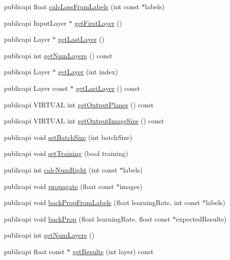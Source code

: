 \begin{DoxyCompactItemize}
publicapi float \hyperlink{classNeuralNet_abd31a3135dcdeaf91eb6ee7be58a676c}{calc\-Loss\-From\-Labels} (int const $\ast$labels)
\item 
publicapi Input\-Layer $\ast$ \hyperlink{classNeuralNet_a2b2ea77732a5969b70453a110c4a10e8}{get\-First\-Layer} ()
\item 
publicapi Layer $\ast$ \hyperlink{classNeuralNet_a21256dd9a2c7834be50f4d84e2c9e947}{get\-Last\-Layer} ()
\item 
publicapi int \hyperlink{classNeuralNet_ab0914b73f5ecd0291f2ce2070d824757}{get\-Num\-Layers} () const 
\item 
publicapi Layer $\ast$ \hyperlink{classNeuralNet_ac1909a900477ba46c7284cfbfa262ead}{get\-Layer} (int index)
\item 
publicapi Layer const $\ast$ \hyperlink{classNeuralNet_a92eb5fa55ec81929637d9c5884de432a}{get\-Last\-Layer} () const 
\item 
publicapi V\-I\-R\-T\-U\-A\-L int \hyperlink{classNeuralNet_ab32d1d2225a84dfeaee28fdf57d7eed6}{get\-Output\-Planes} () const 
\item 
publicapi V\-I\-R\-T\-U\-A\-L int \hyperlink{classNeuralNet_a8b2a3f84373bcd1960275306b24a89b3}{get\-Output\-Image\-Size} () const 
\item 
publicapi void \hyperlink{classNeuralNet_a0d31109594880ff7c7f838ccc5d4609d}{set\-Batch\-Size} (int batch\-Size)
\item 
publicapi void \hyperlink{classNeuralNet_a5566ed539198d3110cf0e30e81ad7b5d}{set\-Training} (bool training)
\item 
publicapi int \hyperlink{classNeuralNet_aa2adb751a3fd02be1b282edb1c653261}{calc\-Num\-Right} (int const $\ast$labels)
\item 
publicapi void \hyperlink{classNeuralNet_aed06c0fdd42fd7b6f9673bc0d498eb0d}{propagate} (float const $\ast$images)
\item 
publicapi void \hyperlink{classNeuralNet_a886970b2efbd3b57e812fd1553760669}{back\-Prop\-From\-Labels} (float learning\-Rate, int const $\ast$labels)
\item 
publicapi void \hyperlink{classNeuralNet_a25c47bc123ef8a279054af26dd5d0f5c}{back\-Prop} (float learning\-Rate, float const $\ast$expected\-Results)
\item 
publicapi int \hyperlink{classNeuralNet_a7974820a72d22f328ae20bf53bdd0f13}{get\-Num\-Layers} ()
\item 
publicapi float const $\ast$ \hyperlink{classNeuralNet_a82c0bb751508ad07ec9ca57c98615828}{get\-Results} (int layer) const 

\end{DoxyCompactItemize}
